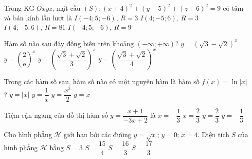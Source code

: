 \begin{ex}%
	Trong KG $Oxyz$, mặt cầu $(S)\colon(x+4)^2+(y-5)^2+(z+6)^2=9$ có tâm và bán kính lần lượt là
	\choice
	{\True $I(-4;5;-6),\,R=3$}
	{$I(4;-5;6),\,R=3$}
	{$I(4;-5;6),\,R=81$}
	{$I(-4;5;-6),\,R=9$}
\end{ex}

\begin{ex}%
	Hàm số nào sau đây đồng biến trên khoảng $(-\infty;+\infty)$?
	\choice
	{$y=\left(\sqrt{3}-\sqrt{2}\right)^x$}
	{$y=\left(\dfrac{2}{\text{e}}\right)^x$}
	{\True $y=\left(\dfrac{\sqrt{3}+\sqrt{2}}{3}\right)^x$}
	{$y=\left(\dfrac{\sqrt{3}+\sqrt{2}}{4}\right)^x$}
\end{ex}

\begin{ex}%
	Trong các hàm số sau, hàm số nào có một nguyên hàm là hàm số $f(x)=\ln\left|x\right|$?
	\choice
	{$y=\left|x\right|$}
	{\True $y=\dfrac{1}{x}$}
	{$y=\dfrac{x^{3}}{2}$}
	{$y=x$}
\end{ex}

\begin{ex}%
	Tiệm cận ngang của đồ thị hàm số $y=\dfrac{x+1}{-3x+2}$ là
	\choice
	{$x=-\dfrac{1}{3}$}
	{$x=\dfrac{2}{3}$}
	{$y=\dfrac{2}{3}$}
	{\True $y=-\dfrac{1}{3}$}
\end{ex}

\begin{ex}%
	Cho hình phẳng $\mathscr{H}$ giới hạn bởi các đường $y=\sqrt{x};\,y=0;\,x=4$. Diện tích $S$ của hình phẳng $\mathscr{H}$ bằng
	\choice
	{$S=3$}
	{$S=\dfrac{15}{4}$}
	{\True $S=\dfrac{16}{3}$}
	{$S=\dfrac{17}{3}$}
\end{ex}

